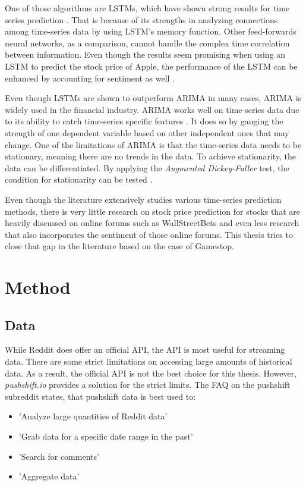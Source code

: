 \documentclass[11pt, a4paper]{article}
\begin{document}
One of those algorithms are LSTMs, which have shown strong results for time series prediction \citep{rammurthy2021lstm}. That is because of its strengths in 
analyzing connections among time-series data by using LSTM's memory function. Other feed-forwards neural networks, as a comparison, cannot handle the complex 
time correlation between information. Even though the results seem promising when using an LSTM to predict the stock price of Apple, the performance of the LSTM 
can be enhanced by accounting for sentiment as well \citep{jin2020lstmsentiment}.

Even though LSTMs are shown to outperform ARIMA in many cases, ARIMA is widely used in the financial industry. ARIMA works well on time-series data due to its
ability to catch time-series specific features \citep{vuong2021forecasting}. It does so by gauging the strength of one dependent variable based on other independent
ones that may change. One of the limitations of ARIMA is that the time-series data needs to be stationary, meaning there are no trends in the data. To achieve
stationarity, the data can be differentiated. By applying the \emph{Augmented Dickey-Fuller} test, the condition for stationarity can be tested \citep{ivanovic2013arima}.

Even though the literature extensively studies various time-series prediction methods, there is very little research on stock price prediction for stocks that are heavily discussed on
online forums such as WallStreetBets and even less research that also incorporates the sentiment of those online forums. This thesis tries to close that gap in the literature based
on the case of Gamestop.



\section{Method}

\subsection{Data} \label{subs:data}

While Reddit does offer an official API, the API is most useful for streaming data. 
There are some strict limitations on accessing large amounts of historical data. As a result, the official API is not the best choice for this thesis. 
However, \emph{pushshift.io} provides a solution for the strict limits.
The FAQ on the pushshift subreddit states, that pushshift data is best used to:
\begin{itemize}
    \item 'Analyze large quantities of Reddit data'
    \item 'Grab data for a specific date range in the past'
    \item 'Search for comments'
    \item 'Aggregate data'
\end{itemize}
\end{document}
